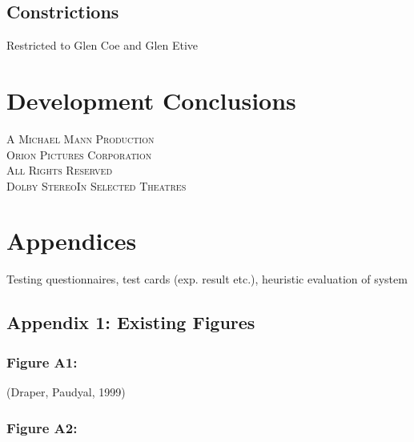 \documentclass[11pt, english]{article}
\begin{document}
	\subsection{Constrictions}

	Restricted to Glen Coe and Glen Etive

\newpage

\section{Development Conclusions}\label{ch8}

	\vspace{\fill}

	\begin{center}
		\textsc{A Michael Mann Production}\\
		\textsc{ Orion Pictures Corporation}\\
		\textsc{\small{All Rights Reserved}}\\
		\textsc{Dolby Stereo\texttrademark In Selected Theatres}
	\end{center}

\newpage



\section*{Appendices}

	Testing questionnaires, test cards (exp. result etc.), heuristic evaluation of system

	\subsection*{Appendix 1: Existing Figures}

		\subsubsection*{Figure A1:}
			
			\begin{center}
			\end{center}

			(Draper, Paudyal, 1999)

		\subsubsection*{Figure A2:}
\end{document}

